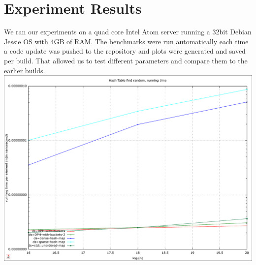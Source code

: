 \documentclass{article}
\begin{document}
\section{Experiment Results}

We ran our experiments on a quad core Intel Atom server running a 32bit Debian
Jessie OS with 4GB of RAM. The benchmarks were run automatically each time a
code update was pushed to the repository and plots were generated and saved per
build. That allowed us to test different parameters and compare them to the
earlier builds.\\

\centering
\includegraphics[width=0.9\linewidth]{img/hash_find-random_time}

\printbibliography
\end{document}

